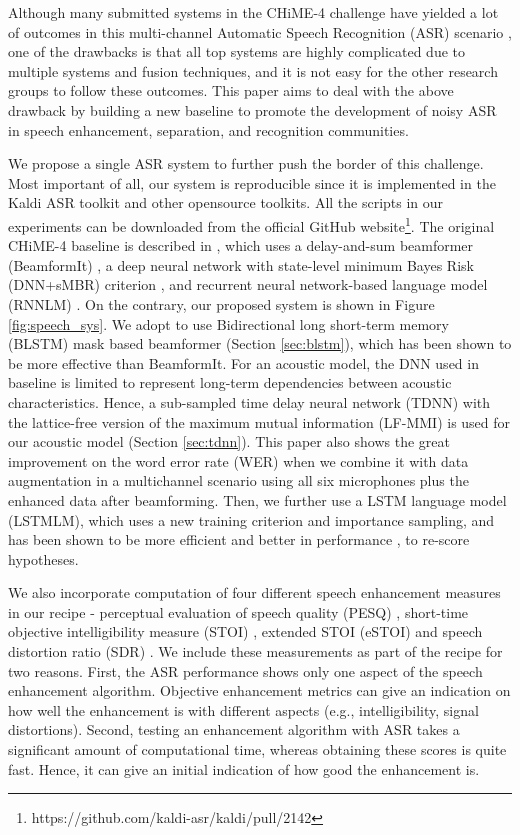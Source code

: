 \documentclass[a4paper]{article}
\begin{document}
Although many submitted systems in the CHiME-4 challenge have yielded a lot of outcomes in this multi-channel Automatic Speech Recognition (ASR) scenario \cite{du2016ustc,menne2016rwth,erdogan2016multi}, one of the drawbacks is that all top systems are highly complicated due to multiple systems and fusion techniques, and it is not easy for the other research groups to follow these outcomes.
This paper aims to deal with the above drawback by building a new baseline to promote the development of noisy ASR in speech enhancement, separation, and recognition communities.

We propose a single ASR system to further push the border of this challenge. 
Most important of all, our system is reproducible since it is implemented in the Kaldi ASR toolkit and other opensource toolkits.
All the scripts in our experiments can be downloaded from the official GitHub website\footnote{https://github.com/kaldi-asr/kaldi/pull/2142}.
The original CHiME-4 baseline is described in \cite{vincent2017analysis}, which uses a delay-and-sum beamformer (BeamformIt) \cite{anguera2007acoustic}, a deep neural network with state-level minimum Bayes Risk (DNN+sMBR) criterion \cite{vesely2013sequence}, and recurrent neural network-based language model (RNNLM) \cite{mikolov2010recurrent}. 
On the contrary, our proposed system is shown in Figure \ref{fig:speech_sys}. 
We adopt to use Bidirectional long short-term memory (BLSTM) mask based beamformer (Section \ref{sec:blstm}), which has been shown to be more effective \cite{erdogan2016improved,nn-gev} than BeamformIt. 
For an acoustic model, the DNN used in baseline is limited to represent long-term dependencies between acoustic characteristics. 
Hence, a sub-sampled time delay neural network (TDNN) \cite{waibel1990phoneme} with the lattice-free version of the maximum mutual information (LF-MMI) is used for our acoustic model \cite{povey2016purely} (Section \ref{sec:tdnn}).
This paper also shows the great improvement on the word error rate (WER) when we combine it with data augmentation in a multichannel scenario using all six microphones plus the enhanced data after beamforming.
Then, we further use a LSTM language model (LSTMLM), which uses a new training criterion and importance sampling, and has been shown to be more efficient and better in performance \cite{xuneural}, to re-score hypotheses.

We also incorporate computation of four different speech enhancement measures in our recipe - perceptual evaluation of speech quality (PESQ) \cite{pesq},  short-time objective intelligibility measure (STOI) \cite{stoi}, extended STOI (eSTOI) \cite{estoi} and speech distortion ratio (SDR) \cite{sdr}. 
We include these measurements as part of the recipe for two reasons. 
First, the ASR performance shows only one aspect of the speech enhancement algorithm. 
Objective enhancement metrics can give an indication on how well the enhancement is with different aspects (e.g., intelligibility, signal distortions).
Second, testing an enhancement algorithm with ASR takes a significant amount of computational time, whereas obtaining these scores is quite fast. 
Hence, it can give an initial indication of how good the enhancement is.
\end{document}
